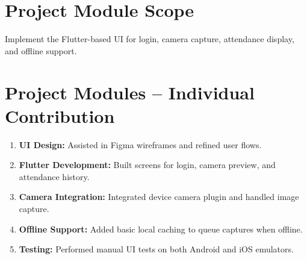 \documentclass[openany]{report}
\begin{document}
\section{Project Module Scope}
Implement the Flutter-based UI for login, camera capture, attendance display, and offline support.

\section{Project Modules – Individual Contribution}
\begin{enumerate}
  \item \textbf{UI Design:} Assisted in Figma wireframes and refined user flows.
  \item \textbf{Flutter Development:} Built screens for login, camera preview, and attendance history.
  \item \textbf{Camera Integration:} Integrated device camera plugin and handled image capture.
  \item \textbf{Offline Support:} Added basic local caching to queue captures when offline.
  \item \textbf{Testing:} Performed manual UI tests on both Android and iOS emulators.
\end{enumerate}
\end{document}
